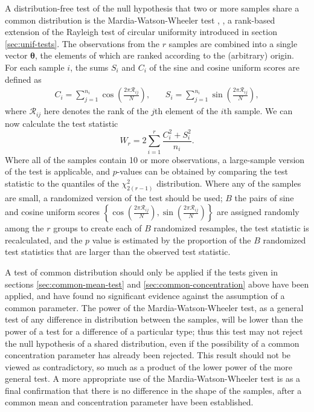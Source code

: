 \documentclass[../../ArchStats.tex]{subfiles}
\begin{document}
A distribution-free test of the null hypothesis that two or more samples share a common distribution is the Mardia-Watson-Wheeler test \cite{Wheeler1962}, \cite{Mardia1972}, a rank-based extension of the Rayleigh test of circular uniformity introduced in section \ref{sec:unif-tests}. The observations from the $r$ samples are combined into a single vector $\boldsymbol{\theta}$, the elements of which are ranked according to the (arbitrary) origin. For each sample $i$, the sums $S_i$ and $C_i$ of the sine and cosine uniform scores are defined as
	\begin{equation}
	\begin{matrix*}
	C_i = \sum_{j=1}^{n_i} \cos \left( \frac{2\pi \mathcal{R}_{ij}}{N} \right),  & \,  &
	S_i = \sum_{j=1}^{n_i} \sin \left( \frac{2\pi \mathcal{R}_{ij}}{N} \right),
	\end{matrix*} 
	\end{equation}
where $\mathcal{R}_{ij}$ here denotes the rank of the $j$th element of the $i$th sample. We can now calculate the test statistic
	\begin{equation}
	W_r = 2 \sum_{i=1}^r \frac{C_i^2 + S_i^2}{n_i}.
 	\end{equation}
Where all of the samples contain 10 or more observations, a large-sample version of the test is applicable, and $p$-values can be obtained by comparing the test statistic to the quantiles of the $\chi^2_{2(r-1)}$ distribution. Where any of the samples are small, a randomized version of the test should be used; $B$ the pairs of sine and cosine uniform scores $\left\lbrace \cos \left( \frac{2\pi \mathcal{R}_{ij}}{N}\right), \sin \left( \frac{2\pi \mathcal{R}_{ij}}{N}\right) \right\rbrace$ are assigned randomly among the $r$ groups to create each of $B$ randomized resamples, the test statistic is recalculated, and the $p$ value is estimated by the proportion of the $B$ randomized test statistics that are larger than the observed test statistic.

A test of common distribution should only be applied if the tests given in sections \ref{sec:common-mean-test} and \ref{sec:common-concentration} above have been applied, and have found no significant evidence against the assumption of a common parameter. The power of the Mardia-Watson-Wheeler test, as a general test of any difference in distribution between the samples, will be lower than the power of a test for a difference of a particular type; thus this test may not reject the null hypothesis of a shared distribution, even if the possibility of a common concentration parameter has already been rejected. This result should not be viewed as contradictory, so much as a product of the lower power of the more general test. A more appropriate use of the Mardia-Watson-Wheeler test is as a final confirmation that there is no difference in the shape of the samples, after a common mean and concentration parameter have been established.
\end{document}
